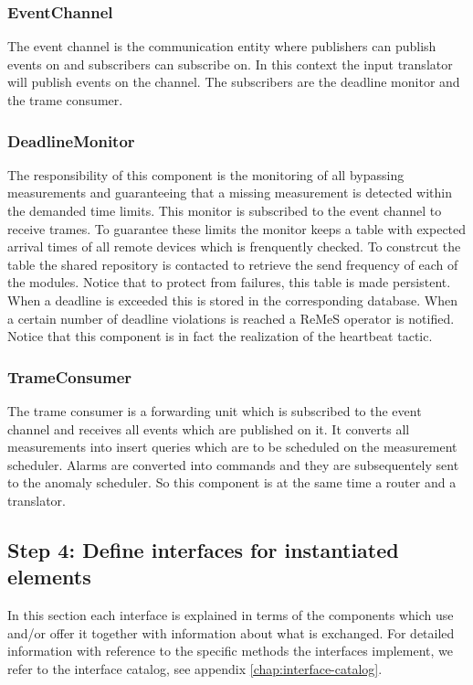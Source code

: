 \subsubsection{EventChannel}

\npar The event channel is the communication entity where publishers can publish
events on and subscribers can subscribe on. In this context the input translator
will publish events on the channel. The subscribers are the deadline monitor and
the trame consumer.

\subsubsection{DeadlineMonitor}

\npar The responsibility of this component is the monitoring of all bypassing
measurements and guaranteeing that a missing measurement is detected within the
demanded time limits. This monitor is subscribed to the event channel to receive
trames. To guarantee these limits the monitor keeps a table with expected
arrival times of all remote devices which is frenquently checked. To constrcut
the table the shared repository is contacted to retrieve the send frequency of
each of the modules. Notice that to protect from failures, this table is made
persistent. When a deadline is exceeded this is stored in the corresponding
database. When a certain number of deadline violations is reached a ReMeS
operator is notified. Notice that this component is in fact the realization of
the heartbeat tactic.

\subsubsection{TrameConsumer}

\npar The trame consumer is a forwarding unit which is subscribed to the event
channel and receives all events which are published on it. It converts all
measurements into insert queries which are to be scheduled on the
measurement scheduler. Alarms are converted into commands and they are
subsequentely sent to the anomaly scheduler. So this component is at the same
time a router and a translator.

\subsection{Step 4: Define interfaces for instantiated elements}
\label{add:it2/interfaces}

\npar In this section each interface is explained in terms of the components
which use and/or offer it together with information about what is exchanged. For
detailed information with reference to the specific methods the interfaces
implement, we refer to the interface catalog, see appendix
\ref{chap:interface-catalog}.


